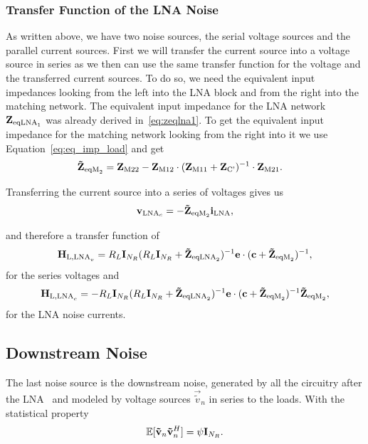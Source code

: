 \subsubsection{Transfer Function of the LNA Noise}
\label{sec:antenna_noise_transf}
As written above, we have two noise sources, the serial voltage sources and the parallel current sources.
First we will transfer the current source into a voltage source in series as we then can use the same transfer function for the voltage and the transferred current sources.
To do so, we need the equivalent input impedances looking from the left into the LNA block and from the right into the matching network.
The equivalent input impedance for the LNA network $\mathbf{Z}_{\text{eqLNA}_1}$ was already derived in~\eqref{eq:zeqlna1}.
To get the equivalent input impedance for the matching network looking from the right into it we use Equation~\eqref{eq:eq_imp_load} and get
\begin{align}
\label{eq:zr}
\mathbf{\tilde{Z}}_{\text{eqM}_2} &= \mathbf{Z}_\text{M22} - \mathbf{Z}_\text{M12}\cdot(\mathbf{Z}_\text{M11} + \mathbf{Z}_\text{C'})^{-1}\cdot\mathbf{Z}_\text{M21}.
\end{align}

Transferring the current source into a series of voltages gives us 
\begin{equation}
\mathbf{v}_{\text{LNA}_c} = -\mathbf{\tilde{Z}}_{\text{eqM}_2} \mathbf{i}_\text{LNA},
\end{equation}

and therefore a transfer function of
\begin{equation}
\mathbf{H}_{\text{L,LNA}_v} = R_L\mathbf{I}_{N_R}(R_L\mathbf{I}_{N_R} + \mathbf{\tilde{Z}}_{\text{eqLNA}_2})^{-1}\mathbf{e}\cdot(\mathbf{c}+\mathbf{\tilde{Z}}_{\text{eqM}_2})^{-1},
\end{equation}
for the series voltages and
\begin{equation}
\mathbf{H}_{\text{L,LNA}_c} = -R_L\mathbf{I}_{N_R}(R_L\mathbf{I}_{N_R} + \mathbf{\tilde{Z}}_{\text{eqLNA}_2})^{-1}\mathbf{e}\cdot(\mathbf{c}+\mathbf{\tilde{Z}}_{\text{eqM}_2})^{-1}\mathbf{\tilde{Z}}_{\text{eqM}_2},
\end{equation}
for the LNA noise currents.



\subsection{Downstream Noise}
\label{sec:down_noise}
The last noise source is the downstream noise, generated by all the circuitry after the LNA~\cite{Hughes2012} and modeled by voltage sources $\vec{\tilde{v}}_n$ in series to the loads.
With the statistical property
\begin{equation}
\label{eq:cov_down}
\mathbb{E}[\mathbf{\tilde{v}}_n\mathbf{\tilde{v}}_n^H] = \psi\mathbf{I}_{N_R}.
\end{equation}

